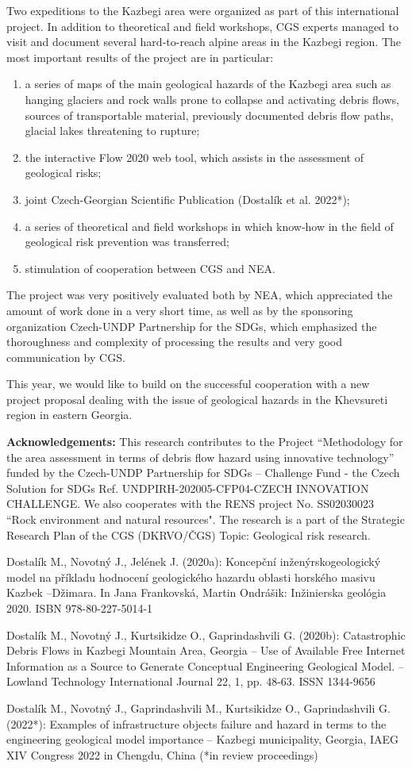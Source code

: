 {Two expeditions to the Kazbegi area were organized as part of this international project. In addition to theoretical and field workshops, CGS experts managed to visit and document several hard-to-reach alpine areas in the Kazbegi region. The most important results of the project are in particular:
\begin{enumerate}
\item  a series of maps of the main geological hazards of the Kazbegi area such as hanging glaciers and rock walls prone to collapse and activating debris flows, sources of transportable material, previously documented debris flow paths, glacial lakes threatening to rupture;
\item the interactive Flow 2020 web tool, which assists in the assessment of geological risks;
\item joint Czech-Georgian Scientific Publication (Dostalík et al. 2022*);
\item a series of theoretical and field workshops in which know-how in the field of geological risk prevention was transferred;
\item stimulation of cooperation between CGS and NEA.
\end{enumerate}	

The project was very positively evaluated both by NEA, which appreciated the amount of work done in a very short time, as well as by the sponsoring organization Czech-UNDP Partnership for the SDGs, which emphasized the thoroughness and complexity of processing the results and very good communication by CGS. 

This year, we would like to build on the successful cooperation with a new project proposal dealing with the issue of geological hazards in the Khevsureti region in eastern Georgia.

\noindent
\textbf{Acknowledgements:}
This research contributes to the Project “Methodology for the area assessment in terms of debris flow hazard using innovative technology” funded by the Czech-UNDP Partnership for SDGs – Challenge Fund - the Czech Solution for SDGs Ref. UNDPIRH-202005-CFP04-CZECH INNOVATION CHALLENGE. 
We also cooperates with the RENS project No. SS02030023 “Rock environment and natural resources".
The research is a part of the Strategic Research Plan of the CGS (DKRVO/ČGS) Topic: Geological risk research.
}
{Dostalík M., Novotný J., Jelének J. (2020a): Koncepční inženýrskogeologický model na příkladu hodnocení geologického hazardu oblasti horského masivu Kazbek –Džimara. In Jana Frankovská, Martin Ondrášik: Inžinierska geológia 2020. ISBN 978-80-227-5014-1

Dostalík M., Novotný J., Kurtsikidze O., Gaprindashvili G. (2020b): Catastrophic Debris Flows in Kazbegi Mountain Area, Georgia – Use of Available Free Internet Information as a Source to Generate Conceptual Engineering Geological Model. – Lowland Technology International Journal 22, 1, pp. 48-63. ISSN 1344-9656
	
Dostalík M., Novotný J., Gaprindashvili M., Kurtsikidze O., Gaprindashvili G. (2022*): Examples of infrastructure objects failure and hazard in terms to the engineering geological model importance – Kazbegi municipality, Georgia, IAEG XIV Congress 2022 in Chengdu, China (*in review proceedings)
}
